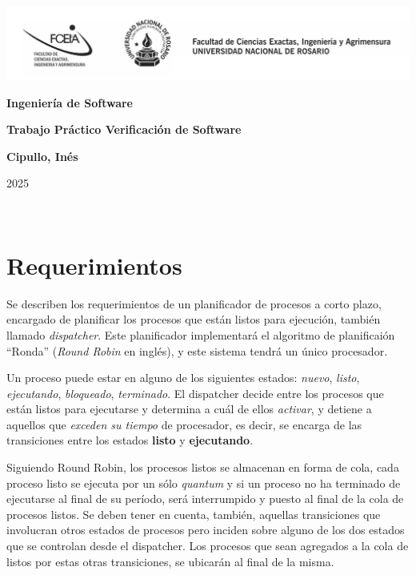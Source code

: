 \documentclass{article}
\begin{document}
\begin{titlepage}
    \hspace{-2.5cm}\includegraphics[scale= 0.48]{header.png}
    \begin{center}
        \vfill
            \noindent\textbf{\Huge Ingeniería de Software}\par
            \vspace{.5cm}
            \noindent\textbf{\Huge Trabajo Práctico Verificación de Software}\par
            \vspace{.5cm}
        \vfill
        \vspace{.5cm}
        \noindent \textbf{\Large Cipullo, Inés}\par
 
        \vfill
        \noindent\large 2025
    \end{center}
\end{titlepage}
\ 

\section{Requerimientos}

Se describen los requerimientos de un planificador de procesos a corto plazo, encargado de planificar los procesos que están listos para ejecución, también llamado \textit{dispatcher}. Este planificador implementará el algoritmo de planificaión ``Ronda'' (\textit{Round Robin} en inglés), y este sistema tendrá un único procesador.

Un proceso puede estar en alguno de los siguientes estados: \textit{nuevo}, \textit{listo}, \textit{ejecutando}, \textit{bloqueado}, \textit{terminado}. El dispatcher decide entre los procesos que están listos para ejecutarse y determina a cuál de ellos \textit{activar}, y detiene a aquellos que \textit{exceden su tiempo} de procesador, es decir, se encarga de las transiciones entre los estados \textbf{listo} y \textbf{ejecutando}. 

Siguiendo Round Robin, los procesos listos se almacenan en forma de cola, cada proceso listo se ejecuta por un sólo \textit{quantum} y si un proceso no ha terminado de ejecutarse al final de su período, será interrumpido y puesto al final de la cola de procesos listos.
Se deben tener en cuenta, también, aquellas transiciones que involucran otros estados de procesos pero inciden sobre alguno de los dos estados que se controlan desde el dispatcher. Los procesos que sean agregados a la cola de listos por estas otras transiciones, se ubicarán al final de la misma.
\end{document}

